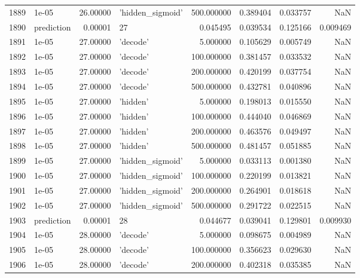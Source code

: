 \documentclass[10pt,a4paper]{article}
\begin{document}
\begin{tabular}{llrlrrrr}
1889 &       1e-05 &  26.00000 &   'hidden\_sigmoid' &  500.000000 &  0.389404 &  0.033757 &       NaN \\
1890 &  prediction &   0.00001 &                 27 &    0.045495 &  0.039534 &  0.125166 &  0.009469 \\
1891 &       1e-05 &  27.00000 &           'decode' &    5.000000 &  0.105629 &  0.005749 &       NaN \\
1892 &       1e-05 &  27.00000 &           'decode' &  100.000000 &  0.381457 &  0.033532 &       NaN \\
1893 &       1e-05 &  27.00000 &           'decode' &  200.000000 &  0.420199 &  0.037754 &       NaN \\
1894 &       1e-05 &  27.00000 &           'decode' &  500.000000 &  0.432781 &  0.040896 &       NaN \\
1895 &       1e-05 &  27.00000 &           'hidden' &    5.000000 &  0.198013 &  0.015550 &       NaN \\
1896 &       1e-05 &  27.00000 &           'hidden' &  100.000000 &  0.444040 &  0.046869 &       NaN \\
1897 &       1e-05 &  27.00000 &           'hidden' &  200.000000 &  0.463576 &  0.049497 &       NaN \\
1898 &       1e-05 &  27.00000 &           'hidden' &  500.000000 &  0.481457 &  0.051885 &       NaN \\
1899 &       1e-05 &  27.00000 &   'hidden\_sigmoid' &    5.000000 &  0.033113 &  0.001380 &       NaN \\
1900 &       1e-05 &  27.00000 &   'hidden\_sigmoid' &  100.000000 &  0.220199 &  0.013821 &       NaN \\
1901 &       1e-05 &  27.00000 &   'hidden\_sigmoid' &  200.000000 &  0.264901 &  0.018618 &       NaN \\
1902 &       1e-05 &  27.00000 &   'hidden\_sigmoid' &  500.000000 &  0.291722 &  0.022515 &       NaN \\
1903 &  prediction &   0.00001 &                 28 &    0.044677 &  0.039041 &  0.129801 &  0.009930 \\
1904 &       1e-05 &  28.00000 &           'decode' &    5.000000 &  0.098675 &  0.004989 &       NaN \\
1905 &       1e-05 &  28.00000 &           'decode' &  100.000000 &  0.356623 &  0.029630 &       NaN \\
1906 &       1e-05 &  28.00000 &           'decode' &  200.000000 &  0.402318 &  0.035385 &       NaN \\

\end{tabular}
\end{document}
